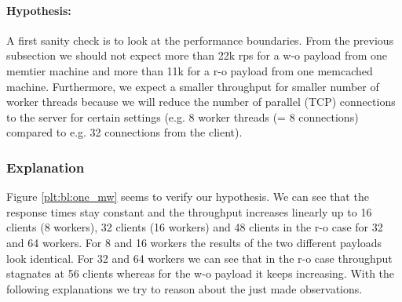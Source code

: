 \documentclass[11pt,a4paper]{article}
\begin{document}
\paragraph{Hypothesis: } A first sanity check is to look at the performance boundaries. From the previous subsection we should not expect more than 22k rps for a w-o payload from one memtier machine and more than 11k for a r-o payload from one memcached machine. Furthermore, we expect a smaller throughput for smaller number of worker threads because we will reduce the number of parallel (TCP) connections to the server for certain settings (e.g. 8 worker threads (= 8 connections) compared to e.g. 32 connections from the client).

\subsubsection{Explanation}\label{subsub:expl_one_mw}

Figure \ref{plt:bl:one_mw} seems to verify our hypothesis. We can see that the response times stay constant and the throughput increases linearly up to 16 clients (8 workers), 32 clients (16 workers) and 48 clients in the r-o case for 32 and 64 workers. For 8 and 16 workers the results of the two different payloads look identical. For 32 and 64 workers we can see that in the r-o case throughput stagnates at 56 clients whereas for the w-o payload it keeps increasing. With the following explanations we try to reason about the just made observations.
\end{document}

